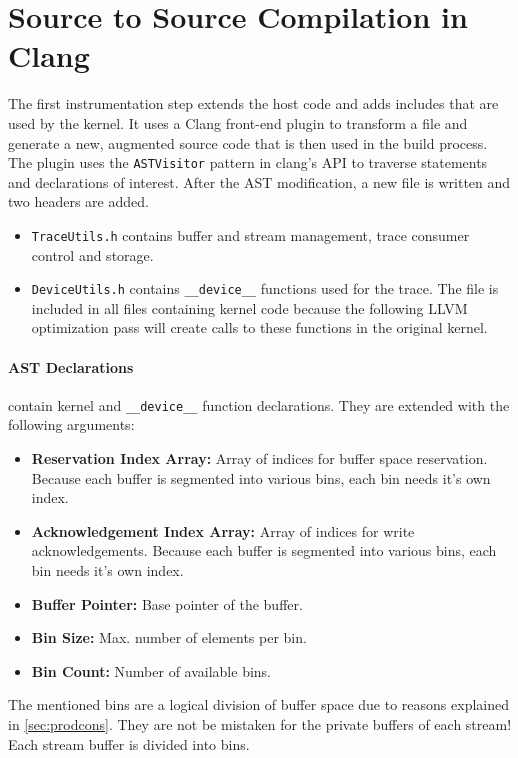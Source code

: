 \section{Source to Source Compilation in Clang}\label{sec:impl:clang}
The first instrumentation step extends the host code and adds includes that are used by the kernel. It uses a Clang front-end plugin to transform a file and generate a new, augmented source code that is then used in the build process. The plugin uses the \verb|ASTVisitor|
pattern in clang's API to traverse statements and declarations of interest. After the AST modification, a new file is written and two
headers are added.

\begin{itemize}
	\item \verb|TraceUtils.h| contains buffer and stream management, trace consumer control and storage.
	\item \verb|DeviceUtils.h| contains \verb|__device__| functions used for the trace. The file is included in all
	files containing kernel code because the following LLVM optimization pass will create calls to these functions in the original kernel.
\end{itemize}

\paragraph{AST Declarations} contain kernel and \verb|__device__| function declarations. They are extended with the following arguments:
\begin{itemize}
	\item \textbf{Reservation Index Array:} Array of indices for buffer space reservation. Because each buffer is segmented into various bins,
		each bin needs it's own index.
	\item \textbf{Acknowledgement Index Array:} Array of indices for write acknowledgements. Because each buffer is segmented into various bins,
	each bin needs it's own index.
	\item \textbf{Buffer Pointer:} Base pointer of the buffer.
	\item \textbf{Bin Size:} Max. number of elements per bin.
	\item \textbf{Bin Count:} Number of available bins.
\end{itemize}
The mentioned bins are a logical division of buffer space due to reasons explained in \ref{sec:prodcons}. They are not be mistaken 
for the private buffers of each stream! Each stream buffer is divided into bins.

